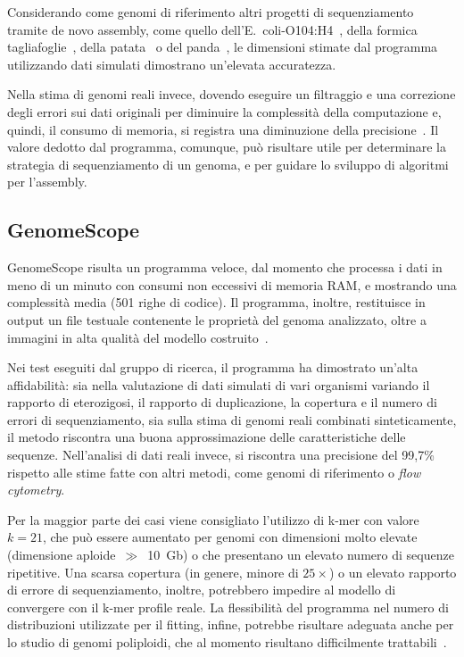 \documentclass[crop=false, class=book]{standalone}
\begin{document}
	Considerando come genomi di riferimento altri progetti di sequenziamento tramite de novo assembly, come quello dell'E.\  coli-O104:H4~\cite{li2011genomic}, della formica tagliafoglie~\cite{nygaard2011genome}, della patata~\cite{xu2011genome} o del panda~\cite{li2010sequence}, le dimensioni stimate dal programma utilizzando dati simulati dimostrano un'elevata accuratezza. 
	
	Nella stima di genomi reali invece, dovendo eseguire un filtraggio e una correzione degli errori sui dati originali per diminuire la complessità della computazione e, quindi, il consumo di memoria, si registra una diminuzione della precisione~\cite{liu2013GCE}. Il valore dedotto dal programma, comunque, può risultare utile per determinare la strategia di sequenziamento di un genoma, e per guidare lo sviluppo di algoritmi per l'assembly. 
	
	
	\subsection{GenomeScope}
	GenomeScope risulta un programma veloce, dal momento che processa i dati in meno di un minuto con consumi non eccessivi di memoria RAM, e mostrando una complessità media (501 righe di codice). Il programma, inoltre, restituisce in output un file testuale contenente le proprietà del genoma analizzato, oltre a immagini in alta qualità del modello costruito~\cite{vurture2017genomescope}.
	
	Nei test eseguiti dal gruppo di ricerca, il programma ha dimostrato un'alta affidabilità: sia nella valutazione di dati simulati di vari organismi variando il rapporto di eterozigosi, il rapporto di duplicazione, la copertura e il numero di errori di sequenziamento, sia sulla stima di genomi reali combinati sinteticamente, il metodo riscontra una buona approssimazione delle caratteristiche delle sequenze. Nell'analisi di dati reali invece, si riscontra una precisione del 99,7\% rispetto alle stime fatte con altri metodi, come genomi di riferimento o \textit{flow cytometry}. 

	Per la maggior parte dei casi viene consigliato l'utilizzo di k-mer con valore $k = 21$, che può essere aumentato per genomi con dimensioni molto elevate (dimensione aploide~$\gg$~10~Gb) o che presentano un elevato numero di sequenze ripetitive. Una scarsa copertura (in genere, minore di $25\times$) o un elevato rapporto di errore di sequenziamento, inoltre, potrebbero impedire al modello di convergere con il k-mer profile reale. La flessibilità del programma nel numero di distribuzioni utilizzate per il fitting, infine, potrebbe risultare adeguata anche per lo studio di genomi poliploidi, che al momento risultano difficilmente trattabili~\cite{sun2017findGSE}.
\end{document}
